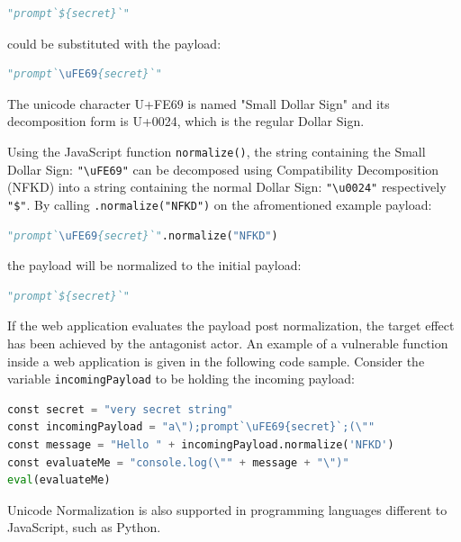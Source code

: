 \begin{lstlisting}[style=basicStyle, language=Python]
"prompt`${secret}`"
\end{lstlisting}

could be substituted with the payload:

\begin{lstlisting}[style=basicStyle, language=Python]
"prompt`\uFE69{secret}`"
\end{lstlisting}

The unicode character U+FE69 is named "Small Dollar Sign" and its decomposition form is U+0024, which is the regular Dollar Sign. \cite{comp/uni}

Using the JavaScript function \verb|normalize()|, the string containing the Small Dollar Sign: \verb|"\uFE69"| can be decomposed using Compatibility Decomposition (NFKD) into a string containing the normal Dollar Sign: \verb|"\u0024"| respectively \verb|"$"|.
By calling \verb|.normalize("NFKD")| on the afromentioned example payload:

\begin{lstlisting}[style=basicStyle, language=Python]
"prompt`\uFE69{secret}`".normalize("NFKD")
\end{lstlisting}

the payload will be normalized to the initial payload:

\begin{lstlisting}[style=basicStyle, language=Python]
"prompt`${secret}`"
\end{lstlisting}

If the web application evaluates the payload post normalization, the target effect has been achieved by the antagonist actor. An example of a vulnerable function inside a web application is given in the following code sample. Consider the variable \verb|incomingPayload| to be holding the incoming payload:

\begin{lstlisting}[style=basicStyle, language=Python, caption=vulnerable through Unicode Normalization code sample]
const secret = "very secret string"
const incomingPayload = "a\");prompt`\uFE69{secret}`;(\""
const message = "Hello " + incomingPayload.normalize('NFKD')
const evaluateMe = "console.log(\"" + message + "\")"
eval(evaluateMe)
\end{lstlisting}

Unicode Normalization is also supported in programming languages different to JavaScript, such as Python. \cite{python/normalization}

